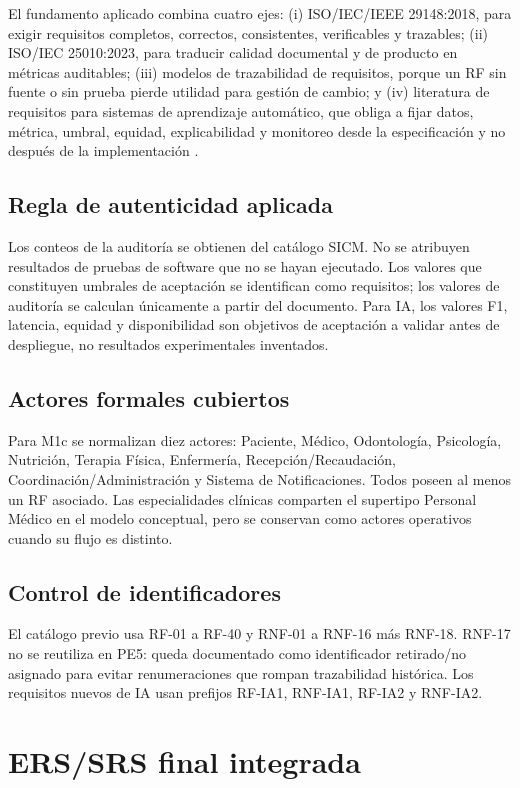 \documentclass[11pt,a4paper]{article}
\begin{document}
	El fundamento aplicado combina cuatro ejes: (i) ISO/IEC/IEEE 29148:2018, para exigir requisitos completos, correctos, consistentes, verificables y trazables; (ii) ISO/IEC 25010:2023, para traducir calidad documental y de producto en métricas auditables; (iii) modelos de trazabilidad de requisitos, porque un RF sin fuente o sin prueba pierde utilidad para gestión de cambio; y (iv) literatura de requisitos para sistemas de aprendizaje automático, que obliga a fijar datos, métrica, umbral, equidad, explicabilidad y monitoreo desde la especificación y no después de la implementación \cite{pohl,swebok,vogelsang2019,ahmad2023,habibullah2023}.
	
	\subsection{Regla de autenticidad aplicada}
	Los conteos de la auditoría se obtienen del catálogo SICM. No se atribuyen resultados de pruebas de software que no se hayan ejecutado. Los valores que constituyen umbrales de aceptación se identifican como requisitos; los valores de auditoría se calculan únicamente a partir del documento. Para IA, los valores F1, latencia, equidad y disponibilidad son objetivos de aceptación a validar antes de despliegue, no resultados experimentales inventados.
	
	\subsection{Actores formales cubiertos}
	Para M1c se normalizan diez actores: Paciente, Médico, Odontología, Psicología, Nutrición, Terapia Física, Enfermería, Recepción/Recaudación, Coordinación/Administración y Sistema de Notificaciones. Todos poseen al menos un RF asociado. Las especialidades clínicas comparten el supertipo Personal Médico en el modelo conceptual, pero se conservan como actores operativos cuando su flujo es distinto.
	
	\subsection{Control de identificadores}
	El catálogo previo usa RF-01 a RF-40 y RNF-01 a RNF-16 más RNF-18. RNF-17 no se reutiliza en PE5: queda documentado como identificador retirado/no asignado para evitar renumeraciones que rompan trazabilidad histórica. Los requisitos nuevos de IA usan prefijos RF-IA1, RNF-IA1, RF-IA2 y RNF-IA2.
	\clearpage
	\section{ERS/SRS final integrada}
\end{document}
